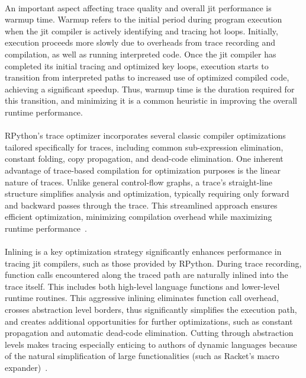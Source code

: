        \paragraph{}%
            An important aspect affecting trace quality and overall \gls{jit} performance is warmup time. Warmup refers to the initial period during program execution when the \gls{jit} compiler is actively identifying and tracing hot loops. Initially, execution proceeds more slowly due to overheads from trace recording and compilation, as well as running interpreted code. Once the \gls{jit} compiler has completed its initial tracing and optimized key loops, execution starts to transition from interpreted paths to increased use of optimized compiled code, achieving a significant speedup. Thus, warmup time is the duration required for this transition, and minimizing it is a common heuristic in improving the overall runtime performance.

        \paragraph{}%
            RPython’s trace optimizer incorporates several classic compiler optimizations tailored specifically for traces, including common sub-expression elimination, constant folding, copy propagation, and dead-code elimination. One inherent advantage of trace-based compilation for optimization purposes is the linear nature of traces. Unlike general control-flow graphs, a trace's straight-line structure simplifies analysis and optimization, typically requiring only forward and backward passes through the trace. This streamlined approach ensures efficient optimization, minimizing compilation overhead while maximizing runtime performance~\cite{loop-aware:12}.

        \paragraph{}%
            Inlining is a key optimization strategy significantly enhances performance in tracing \gls{jit} compilers, such as those provided by RPython. During trace recording, function calls encountered along the traced path are naturally inlined into the trace itself. This includes both high-level language functions and lower-level runtime routines. This aggressive inlining eliminates function call overhead, crosses abstraction level borders, thus significantly simplifies the execution path, and creates additional opportunities for further optimizations, such as constant propagation and automatic dead-code elimination. Cutting through abstraction levels makes tracing especially enticing to authors of dynamic languages because of the natural simplification of large functionalities (such as Racket's macro expander)~\cite{gal:2006,pypy-main}.

